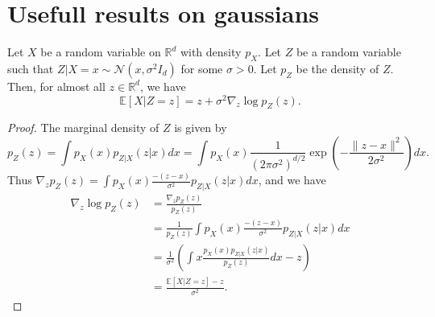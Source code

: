 \documentclass[12pt]{article}
\begin{document}
\section{Usefull results on gaussians}

\begin{lemma}
    \label{lem:tweedie}
    Let $X$ be a random variable on $\mathbb{R}^d$ with density $p_X$. Let $Z$ be
    a random variable such that $Z | X = x \sim \mathcal{N}(x, \sigma^2 I_d)$ for some $\sigma > 0$.
    Let $p_Z$ be the density of $Z$. Then, for almost all $z \in \mathbb{R}^d$, we have
    $$\mathbb{E}[X | Z = z] = z + \sigma^2 \nabla_z \log p_Z(z).$$
\end{lemma}

\begin{proof}
    The marginal density of $Z$ is given by
    $$p_Z(z) = \int p_X(x) p_{Z|X}(z | x) dx = \int p_X(x) \frac{1}{(2 \pi \sigma^2)^{d/2}} 
    \exp\left(-\frac{\|z - x\|^2}{2 \sigma^2}\right) dx.$$
    Thus $\nabla_z p_Z(z) = \int p_X(x) \frac{-(z - x)}{\sigma^2} p_{Z|X}(z | x) dx$,
    and we have
    \begin{align*}
        \nabla_z \log p_Z(z) 
        & = \frac{\nabla_z p_Z(z)}{p_Z(z)} \\
        & = \frac{1}{p_Z(z)} \int p_X(x) \frac{-(z - x)}{\sigma^2} p_{Z|X}(z | x) dx \\
        & = \frac{1}{\sigma^2} \left( \int x \frac{p_X(x) p_{Z|X}(z | x)}{p_Z(z)} dx - z \right) \\
        & = \frac{\mathbb{E}[X | Z = z] - z}{\sigma^2}.
    \end{align*}
\end{proof}
\end{document}
